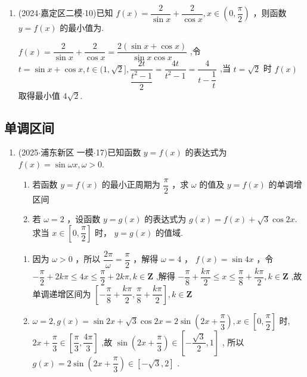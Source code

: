 \begin{enumerate}
    \item (2024$\cdot$嘉定区二模$\cdot$10)已知 $f\left( x\right)  = \dfrac{2}{\sin x} + \dfrac{2}{\cos x},x \in  \left( {0,\dfrac{\pi }{2}}\right)$ ，则函数 $y = f\left( x\right)$ 的最小值为.
    \begin{jieda}
        $f\left( x\right)  = \dfrac{2}{\sin x} + \dfrac{2}{\cos x} = \dfrac{2\left( {\sin x + \cos x}\right) }{\sin x\cos x}$ ,令 $t = \sin x +  \cos x,t \in  (1,\sqrt{2}\rbrack ,\dfrac{2t}{\dfrac{{t}^{2} - 1}{2}} = \dfrac{4t}{{t}^{2} - 1} = \dfrac{4}{t - \dfrac{1}{t}}$ ,当 $t = \sqrt{2}$ 时 $f\left( x\right)$ 取得最小值 $4\sqrt{2}$.
    \end{jieda}
\end{enumerate}
\subsection*{单调区间}
\begin{enumerate}
    \item (2025$\cdot$浦东新区 一模$\cdot$17)已知函数 $y = f\left( x\right)$ 的表达式为 $f\left( x\right)  = \sin {\omega x},\omega  > 0$.
    \begin{enumerate}
        \item 若函数 $y = f\left( x\right)$ 的最小正周期为 $\dfrac{\pi }{2}$ ，求 $\omega$ 的值及 $y = f\left( x\right)$ 的单调增区间
        \item 若 $\omega  = 2$ ，设函数 $y = g\left( x\right)$ 的表达式为 $g\left( x\right)  = f\left( x\right)  + \sqrt{3}\cos {2x}$. 求当 $x \in  \left\lbrack  {0,\dfrac{\pi }{2}}\right\rbrack$ 时， $y =  g\left( x\right)$ 的值域.
    \end{enumerate}
    \begin{jieda}
        \begin{enumerate}
            \item 因为 $\omega  > 0$ ，所以 $\dfrac{2\pi }{\omega } = \dfrac{\pi }{2}$ ，解得 $\omega  = 4$ ， $f\left( x\right)  = \sin {4x}$ ，令 $- \dfrac{\pi }{2} + {2k\pi } \leq  {4x} \leq  \dfrac{\pi }{2} + {2k\pi },k \in  \mathbf{Z}$ ,解得 $- \dfrac{\pi }{8} + \dfrac{k\pi }{2} \leq  x \leq  \dfrac{\pi }{8} +  \dfrac{k\pi }{2},k \in  \mathbf{Z}$ ,故单调递增区间为 $\left\lbrack  {-\dfrac{\pi }{8} + \dfrac{k\pi }{2},\dfrac{\pi }{8} + \dfrac{k\pi }{2}}\right\rbrack  ,k \in  \mathbf{Z}$
            \item $\omega  = 2,g\left( x\right)  = \sin {2x} + \sqrt{3}\cos {2x} = 2\sin \left( {{2x} + \dfrac{\pi }{3}}\right) ,x \in  \left\lbrack  {0,\dfrac{\pi }{2}}\right\rbrack$ 时, ${2x} + \dfrac{\pi }{3} \in  \left\lbrack  {\dfrac{\pi }{3},\dfrac{4\pi }{3}}\right\rbrack$ ,故 $\sin \left( {{2x} + \dfrac{\pi }{3}}\right)  \in  \left\lbrack  {-\dfrac{\sqrt{3}}{2},1}\right\rbrack$ , 所以 $g\left( x\right)  = 2\sin \left( {{2x} + \dfrac{\pi }{3}}\right)  \in  \left\lbrack  {-\sqrt{3},2}\right\rbrack$ .
        \end{enumerate}
    \end{jieda}
\end{enumerate}
